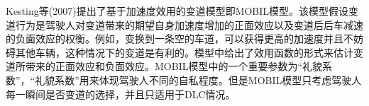 %
Kesting等(2007)提出了基于加速度效用的变道模型即MOBIL模型\cite{Kesting2007}。该模型假设变道行为是驾驶人对变道带来的期望自身加速度增加的正面效应以及变道后后车减速的负面效应的权衡。例如，变换到一条空的车道，可以获得更高的加速度并且不妨碍其他车辆，这种情况下的变道是有利的。模型中给出了效用函数的形式来估计变道所带来的正面效应和负面效应。MOBIL模型中的一个重要参数为“礼貌系数”，“礼貌系数”用来体现驾驶人不同的自私程度。但是MOBIL模型只考虑驾驶人每一瞬间是否变道的选择，并且只适用于DLC情况。





